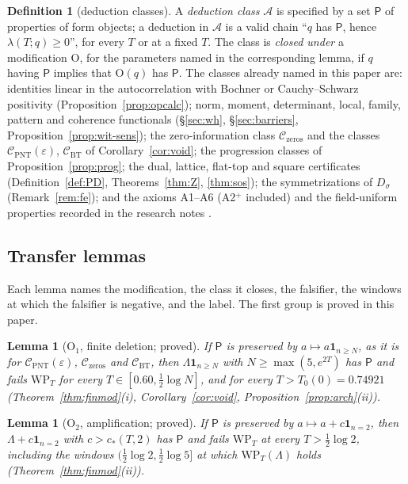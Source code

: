\documentclass[11pt]{amsart}
\newtheorem{lemma}[theorem]{Lemma}
\theoremstyle{definition}
\newtheorem{definition}[theorem]{Definition}
\theoremstyle{remark}
\begin{document}
\begin{definition}[deduction classes]\label{def:shape-class}
A \emph{deduction class} $\mathcal A$ is specified by a set $\mathsf P$ of properties of form objects; a deduction in $\mathcal A$ is a
valid chain ``$q$ has $\mathsf P$, hence $\lambda(T;q)\ge0$'', for every $T$ or at a fixed $T$. The class is \emph{closed under} a
modification $\mathrm O$, for the parameters named in the corresponding lemma, if $q$ having $\mathsf P$ implies that $\mathrm O(q)$
has $\mathsf P$. The classes already named in this paper are: identities linear in the autocorrelation with Bochner or Cauchy--Schwarz
positivity (Proposition~\ref{prop:opcalc}); norm, moment, determinant, local, family, pattern and coherence functionals
(\S\ref{sec:wh}, \S\ref{sec:barriers}, Proposition~\ref{prop:wit-sens}); the zero-information class $\mathcal C_{\mathrm{zeros}}$ and
the classes $\mathcal C_{\mathrm{PNT}}(\varepsilon)$, $\mathcal C_{\mathrm{BT}}$ of Corollary~\ref{cor:void}; the progression classes of
Proposition~\ref{prop:prog}; the dual, lattice, flat-top and square certificates (Definition~\ref{def:PD}, Theorems~\ref{thm:Z},
\ref{thm:sos}); the symmetrizations of $D_\sigma$ (Remark~\ref{rem:fe}); and the axioms A1--A6 (A2$^+$ included) and the field-uniform properties recorded in the research notes
\cite[\S18]{Paper46}.
\end{definition}

\subsection{Transfer lemmas}

Each lemma names the modification, the class it closes, the falsifier, the windows at which the falsifier is negative, and the label.
The first group is proved in this paper.

\begin{lemma}[$\mathrm O_1$, finite deletion; proved]\label{lem:shape-del}
If $\mathsf P$ is preserved by $a\mapsto a\mathbf 1_{n\ge N}$, as it is for $\mathcal C_{\mathrm{PNT}}(\varepsilon)$,
$\mathcal C_{\mathrm{zeros}}$ and $\mathcal C_{\mathrm{BT}}$, then $\Lambda\mathbf 1_{n\ge N}$ with $N\ge\max(5,e^{2T})$ has $\mathsf P$
and fails $\mathrm{WP}_T$ for every $T\in[0.60,\frac12\log N]$, and for every $T>T_0(0)=0.74921$ (Theorem~\ref{thm:finmod}(i),
Corollary~\ref{cor:void}, Proposition~\ref{prop:arch}(ii)).
\end{lemma}

\begin{lemma}[$\mathrm O_2$, amplification; proved]\label{lem:shape-amp}
If $\mathsf P$ is preserved by $a\mapsto a+c\mathbf 1_{n=2}$, then $\Lambda+c\mathbf 1_{n=2}$ with $c>c_*(T,2)$ has $\mathsf P$ and fails
$\mathrm{WP}_T$ at every $T>\frac12\log2$, including the windows $(\frac12\log2,\frac12\log5]$ at which $\mathrm{WP}_T(\Lambda)$ holds
(Theorem~\ref{thm:finmod}(ii)).
\end{lemma}
\end{document}
